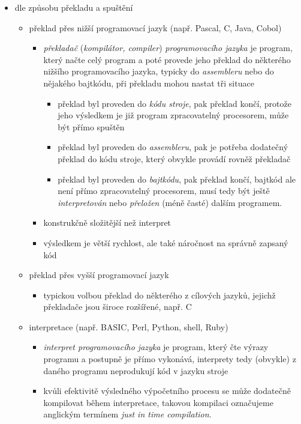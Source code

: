 \documentclass[10pt,a4paper]{article}
\begin{document}
\begin{itemize}
\begin{itemize}
\begin{itemize}
          \end{itemize}
        \end{itemize}
        \item dle způsobu překladu a spuštění
        \begin{itemize}
          \item překlad přes nižší programovací jazyk (např. Pascal, C, Java, Cobol)
          \begin{itemize}
            \item \textit{překladač} (\textit{kompilátor, compiler}) \textit{programovacího jazyka} je program, který načte celý program a poté provede jeho překlad do některého nižšího programovacího jazyka, typicky do \textit{assembleru} nebo do nějakého bajtkódu, při překladu mohou nastat tři situace
            \begin{itemize}
              \item překlad byl proveden do \textit{kódu stroje}, pak překlad končí, protože jeho výsledkem je již program zpracovatelný procesorem, může být přímo spuštěn
              \item překlad byl proveden do \textit{assembleru}, pak je potřeba dodatečný překlad do kódu stroje, který obvykle provádí rovněž překladač
              \item překlad byl proveden do \textit{bajtkódu}, pak překlad končí, bajtkód ale není přímo zpracovatelný procesorem, musí tedy být ještě \textit{interpretován} nebo \textit{přeložen} (méně časté) dalším programem.
            \end{itemize}
            \item konstrukčně složitější než interpret
            \item výsledkem je větší rychlost, ale také náročnost na správně zapsaný kód
          \end{itemize}
          \item překlad přes vyšší programovací jazyk
          \begin{itemize}
            \item typickou volbou překlad do některého z cílových jazyků, jejichž překladače jsou široce rozšířené, např. C
          \end{itemize}
          \item interpretace (např. BASIC, Perl, Python, shell, Ruby)
          \begin{itemize}
            \item \textit{interpret programovacího jazyka} je program, který čte výrazy programu a postupně je přímo vykonává, interprety tedy (obvykle) z daného programu neprodukují kód v jazyku stroje
            \item kvůli efektivitě výsledného výpočetního procesu se může dodatečně kompilovat během interpretace, takovou kompilaci označujeme anglickým termínem \textit{just in time compilation}.
          \end{itemize}
        \end{itemize}
      \end{itemize}
\end{document}
